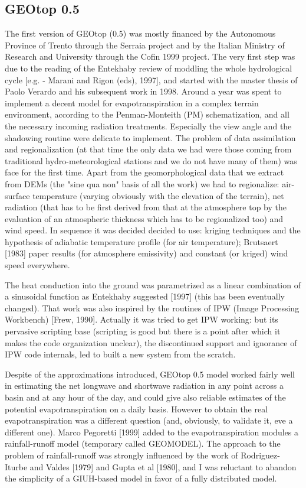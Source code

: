 \subsection{GEOtop 0.5}
The first version of GEOtop (0.5) was mostly financed by the Autonomous Province of Trento through the Serraia project and by the Italian Ministry of Research and University through the Cofin 1999 project.
The very first step was due to the reading of the Entekhaby review of moddling the whole hydrological cycle [e.g. - Marani and Rigon (eds), 1997], and started with  the master thesis of Paolo Verardo and his subsequent work in 1998. Around a year was spent to implement a decent model for evapotranspiration in a complex terrain environment, according to the Penman-Monteith (PM) schematization, and all the necessary incoming radiation treatments.
 Especially the view angle and the shadowing routine were delicate to implement. The  problem of data assimilation and regionalization (at that time the only data we had were those coming from traditional hydro-meteorological stations and we do not have many of them) was face for the first time. 
Apart from the geomorphological data that we extract from DEMs (the "sine qua non" basis of all the work) we had to regionalize: air-surface temperature (varying obviously with the elevation of the terrain), net radiation (that has to be first derived from that at the atmosphere top by the evaluation of an atmospheric thickness which has to be regionalized too) and wind speed. 
In sequence it was decided decided to use: kriging  techniques and the hypothesis of adiabatic temperature profile (for air temperature); Brutsaert [1983] paper results (for atmosphere emissivity) and constant (or kriged) wind speed everywhere. 

The heat conduction into the ground was parametrized as a linear combination of a sinusoidal function as Entekhaby suggested [1997] (this has been eventually changed). That work  was also inspired by the routines  of IPW (Image Processing Workbench) [Frew, 1990]. 
Actually it was tried to get IPW working: but its pervasive scripting base (scripting is good but there is a point after which it makes the code organization unclear), the discontinued support and ignorance of IPW code internals, led  to built a new system from the scratch. 

Despite of the approximations introduced, GEOtop 0.5 model worked fairly well in estimating the net longwave and shortwave radiation in any point across a basin and at any hour of the day, and could give also reliable estimates of the potential evapotranspiration on a daily basis. However to obtain the real evapotranspiration was a different question (and, obviously, to validate it, eve a different one).  
Marco Pegoretti [1999] added to the evapotranspiration modules a rainfall-runoff model (temporary called GEOMODEL). The approach to the problem of rainfall-runoff  was strongly influenced by the work of Rodriguez-Iturbe and Valdes [1979] and Gupta et al [1980],  and I was reluctant to abandon the simplicity of a GIUH-based model in favor of a fully distributed model. 

